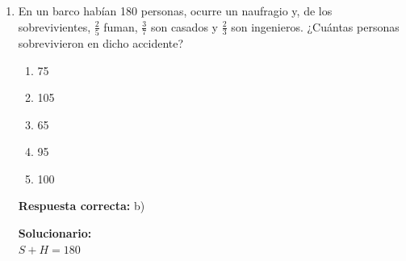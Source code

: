 \begin{enumerate}
	
	
	\begin{enumerate}[label=\Roman*.] %
		\item \quad $\underbrace{q}_{\text{Si Juan termina su tarea,}} \to \underbrace{\neg p}_{\text{entonces Juan no va al cine}}$
		\quad $\equiv$ \quad $\underbrace{\neg q}_{\text{Juan no termina su tarea}} \lor \underbrace{\neg p}_{\text{o no va al cine}}$\\
		\item \quad $\underbrace{\neg}_{\text{No es cierto que , }} \underbrace{(q \land p)}_{\text{Juan termine su tarea y vaya al cine}}$
		\quad $\equiv$ \quad $\underbrace{\neg q}_{\text{}} \lor \underbrace{\neg p}_{\text{}}$\\
		\item \quad $\underbrace{\neg q}_{\text{Juan no termina su tarea}} \land \underbrace{\neg p}_{\text{y no va al cine}}$\\
	\end{enumerate}
	
	\vspace{0.5cm}
	
	\noindent Son equivalentes I y II
	
	\noindent $\neg p \lor \neg q \equiv \neg (p \land q)$
	\vspace{6mm}
	
	\item En un barco habían 180 personas, ocurre un naufragio y, de los sobrevivientes, $\frac{2}{5}$ fuman, $\frac{3}{7}$ son casados y $\frac{2}{3}$ son ingenieros. ¿Cuántas personas sobrevivieron en dicho accidente?
	
	\begin{enumerate}[label=\alph*)]
		\item 75
		\item 105
		\item 65
		\item 95
		\item 100
	\end{enumerate}
	\textbf{Respuesta correcta:} b)
	
	\vspace{2mm}
	\textbf{Solucionario:}\\
	
	\noindent $S + H = 180$
	
	\vspace{0.5cm}
	
	
	
	\begin{tikzpicture}[font=\normalsize]
		

\end{tikzpicture}
\end{enumerate}
